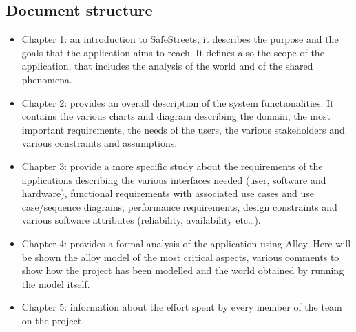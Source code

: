 \subsection{Document structure}
\begin{itemize}
	\item Chapter 1: an introduction to SafeStreets; it describes the purpose and the goals that the application aims to reach. It defines also the scope of the application, that includes the analysis of the world and of the shared phenomena. 
	\item Chapter 2: provides an overall description of the system functionalities. It contains the various charts and diagram describing the domain, the most important requirements, the needs of the users, the various stakeholders and various constraints and assumptions. 
	\item Chapter 3: provide a more specific study about the requirements of the applications describing the various interfaces needed (user, software and hardware), functional requirements with associated use cases and use case/sequence diagrams, performance requirements, design constraints and various software attributes (reliability, availability etc…). 
	\item Chapter 4: provides a formal analysis of the application using Alloy. Here will be shown the alloy model of the most critical aspects, various comments to show how the project has been modelled and the world obtained by running the model itself. 
	\item Chapter 5: information about the effort spent by every member of the team on the project. 
\end{itemize}